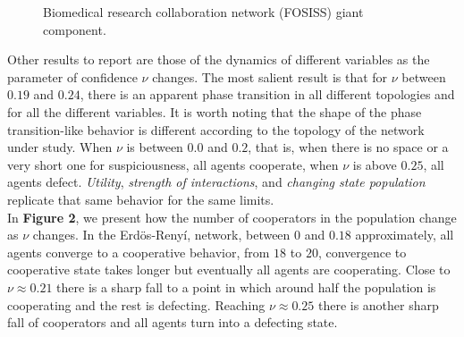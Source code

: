 \documentclass{bmcart}
\def\texttt{[image: ]}
\begin{document}
\begin{figure} [h!]
\centering
\caption{Biomedical research collaboration network (FOSISS) giant component.}\label{Fosiss_GC}
\end{figure}


Other results to report are those of the dynamics of different
variables as the parameter of confidence $\nu$ changes. The  most salient
result is that for $\nu$ between $0.19$ and $0.24$, there is an
apparent phase transition in all different topologies and for all the
different variables. It is worth noting that the shape
of the phase transition-like behavior is different according to the topology of the
network under study. When $\nu$ is between $0.0$ and $0.2$, that is, when there is
no space or a very short one for suspiciousness, all agents cooperate, when
$\nu$ is above $0.25$, all agents defect. \textit{Utility},
\textit{strength of interactions}, and \textit{changing state population}
replicate that same behavior for the same limits. \\ 

In \textbf{Figure 2}, we present how the number of cooperators in the population
change as $\nu$ changes. In the Erd\"{o}s-Reny\'i, network, between $0$ and
$0.18$ approximately, all agents converge to a cooperative behavior, from $18$
to $20$, convergence to cooperative state takes longer but eventually all agents
are cooperating. Close to $\nu \approx 0.21$ there is a sharp fall to a point in
which around half the population is cooperating and the rest is
defecting. Reaching $\nu \approx 0.25$ there is another sharp fall of
cooperators and all agents turn into a defecting state.\\
\end{document}
